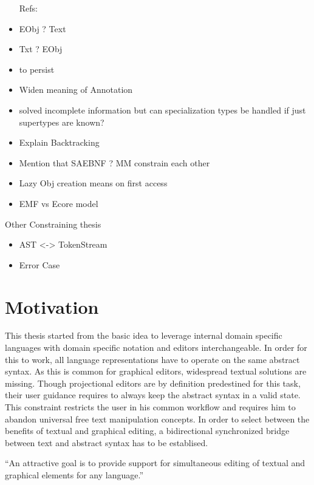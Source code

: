 \begin{itemize}
Refs:
	\item EObj ? Text
	\item Txt ? EObj
	\item to persist
	\item Widen meaning of Annotation
	\item solved incomplete information but can specialization types be handled if just supertypes are known? 
	\item Explain Backtracking
	\item Mention that SAEBNF ? MM constrain each other
	\item Lazy Obj creation means on first access
	\item EMF vs Ecore model
\end{itemize}
Other Constraining thesis
\begin{itemize}
	\item AST <-> TokenStream
	\item Error Case
\end{itemize}
\section{Motivation}
This thesis started from the basic idea to leverage internal domain specific languages with domain specific notation and editors interchangeable. In order for this to work, all language representations have to operate on the same abstract syntax. As this is common for graphical editors, widespread textual solutions are missing. Though projectional editors are by definition predestined for this task, their user guidance requires to always keep the abstract syntax in a valid state. This constraint restricts the user in his common workflow and requires him to abandon universal free text manipulation concepts. In order to select between the benefits of textual and graphical editing, a bidirectional synchronized bridge between text and abstract syntax has to be establised.  

``An attractive goal is to provide support for simultaneous editing of textual and graphical elements for any language.''\cite{EMP}

